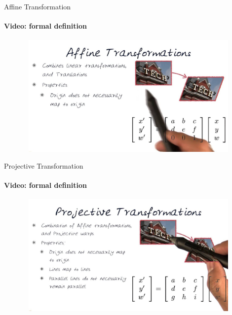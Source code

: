 \documentclass[aspectratio=169]{beamer}
\begin{document}
\begin{frame}[t]{Affine Transformation}
    \framesubtitle{Video: formal definition}
    \vspace{-0.6cm}
    \begin{figure}[H]
        \href{https://www.youtube.com/watch?v=il6Z5LCykZk}{
            \centering\includegraphics[height=6cm,width=1\textwidth,keepaspectratio]{formal_def.jpg}}
        \label{fig:formal_def.jpg}
    \end{figure}
\end{frame}

\begin{frame}[t]{Projective Transformation}
    \framesubtitle{Video: formal definition}
    \vspace{-0.6cm}
    \begin{figure}[H]
        \href{https://www.youtube.com/watch?v=uyYKPUZg3og}{
            \centering\includegraphics[height=6cm,width=1\textwidth,keepaspectratio]{proj_def.jpg}}
        \label{fig:proj_def.jpg}
    \end{figure}
\end{frame}
\end{document}
